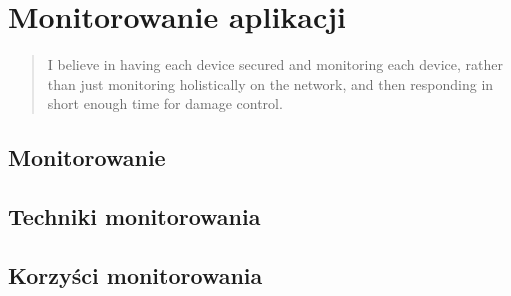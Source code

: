 \chapter[Monitorowania aplikacji]{Monitorowanie aplikacji}
\label{chapter:monitoring}

\begin{quote}
	I believe in having each device secured and monitoring each device, rather than just
	monitoring holistically on the network, and then responding in short enough time for damage control.
\end{quote}

\section{Monitorowanie}
\section{Techniki monitorowania}
\section{Korzyści monitorowania}